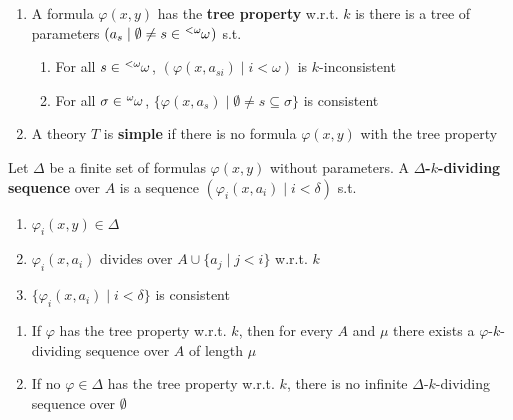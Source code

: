 \documentclass[11pt]{article}
\begin{document}
\begin{definition}[]
\begin{enumerate}
\item A formula \(\varphi(x,y)\) has the \textbf{tree property} w.r.t. \(k\) is there is a tree of
parameters \((a_s\mid\emptyset\neq s\in\tensor[^{<\omega}]{\omega}{})\) s.t.
\begin{enumerate}
\item For all \(s\in\tensor[^{<\omega}]{\omega}{}\), \((\varphi(x,a_{si})\mid i<\omega)\) is \(k\)-inconsistent
\item For all \(\sigma\in\tensor[^\omega]{\omega}{}\), \(\{\varphi(x,a_s)\mid\emptyset\neq s\subseteq\sigma\}\) is consistent
\end{enumerate}
\item A theory \(T\) is \textbf{simple} if there is no formula \(\varphi(x,y)\) with the tree property
\end{enumerate}
\end{definition}

\begin{definition}[]
Let \(\Delta\) be a finite set of formulas \(\varphi(x,y)\) without parameters. A \textbf{\(\Delta\)-\(k\)-dividing
sequence} over \(A\) is a sequence \((\varphi_i(x,a_i)\mid i<\delta)\) s.t.
\begin{enumerate}
\item \(\varphi_i(x,y)\in\Delta\)
\item \(\varphi_i(x,a_i)\) divides over \(A\cup\{a_j\mid j<i\}\) w.r.t. \(k\)
\item \(\{\varphi_i(x,a_i)\mid i<\delta\}\) is consistent
\end{enumerate}
\end{definition}

\begin{lemma}[]
\label{lemma7.2.4}
\begin{enumerate}
\item If \(\varphi\) has the tree property w.r.t. \(k\), then for every \(A\) and \(\mu\) there exists a
\(\varphi\)-\(k\)-dividing sequence over \(A\) of length \(\mu\)
\item If no \(\varphi\in\Delta\) has the tree property w.r.t. \(k\), there is no infinite \(\Delta\)-\(k\)-dividing
sequence over \(\emptyset\)
\end{enumerate}
\end{lemma}
\end{document}
